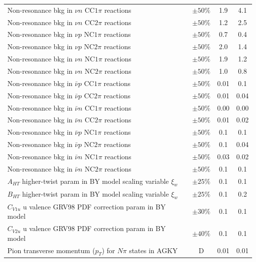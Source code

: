 \begin{longtable}{p{3in} c @{\hskip 0.25in} c c}
  Non-resonance bkg in $\nu n$ CC$1\pi$ reactions & $\pm50\%$ & 1.9 & 4.1 \\
  Non-resonance bkg in $\nu n$ CC$2\pi$ reactions & $\pm50\%$ & 1.2 & 2.5 \\
  Non-resonance bkg in $\nu p$ NC$1\pi$ reactions & $\pm50\%$ & 0.7 & 0.4 \\
  Non-resonance bkg in $\nu p$ NC$2\pi$ reactions & $\pm50\%$ & 2.0 & 1.4 \\
  Non-resonance bkg in $\nu n$ NC$1\pi$ reactions & $\pm50\%$ & 1.9 & 1.2 \\
  Non-resonance bkg in $\nu n$ NC$2\pi$ reactions & $\pm50\%$ & 1.0 & 0.8 \\
  Non-resonance bkg in $\bar{\nu} p$ CC$1\pi$ reactions & $\pm50\%$ & 0.01 & 0.1 \\
  Non-resonance bkg in $\bar{\nu} p$ CC$2\pi$ reactions & $\pm50\%$ & 0.01 & 0.04 \\
  Non-resonance bkg in $\bar{\nu} n$ CC$1\pi$ reactions & $\pm50\%$ & 0.00 & 0.00 \\
  Non-resonance bkg in $\bar{\nu} n$ CC$2\pi$ reactions & $\pm50\%$ & 0.01 & 0.02 \\
  Non-resonance bkg in $\bar{\nu} p$ NC$1\pi$ reactions & $\pm50\%$ & 0.1 & 0.1 \\
  Non-resonance bkg in $\bar{\nu} p$ NC$2\pi$ reactions & $\pm50\%$ & 0.1 & 0.04 \\
  Non-resonance bkg in $\bar{\nu} n$ NC$1\pi$ reactions & $\pm50\%$ & 0.03 & 0.02 \\
  Non-resonance bkg in $\bar{\nu} n$ NC$2\pi$ reactions & $\pm50\%$ & 0.1 & 0.1 \\
  $A_{HT}$ higher-twist param in BY model scaling variable $\xi_w$ & $\pm25\%$ & 0.1 & 0.1 \\
  $B_{HT}$ higher-twist param in BY model scaling variable $\xi_w$ & $\pm25\%$ & 0.1 & 0.2 \\
  $C_{V1u}$ u valence GRV98 PDF correction param in BY model & $\pm30\%$ & 0.1 & 0.1 \\
  $C_{V2u}$ u valence GRV98 PDF correction param in BY model & $\pm40\%$ & 0.1 & 0.1 \\
  Pion transverse momentum ($p_T$) for $N\pi$ states in AGKY & D & 0.01 & 0.01 \\

\end{longtable}

